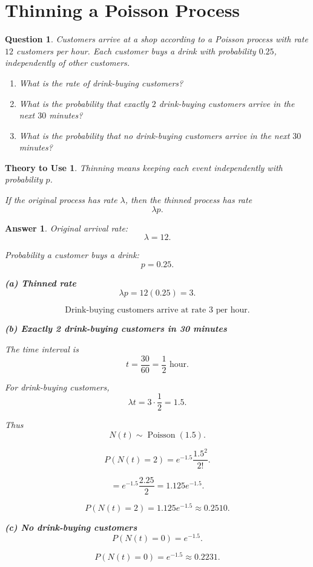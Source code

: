 \documentclass[12pt]{article}
\newtheorem{question}{Question}
\newtheorem*{theory}{Theory to Use}
\newtheorem*{answer}{Answer}
\begin{document}
\section{Thinning a Poisson Process}

\begin{question}
Customers arrive at a shop according to a Poisson process with rate \(12\) customers per hour.
Each customer buys a drink with probability \(0.25\), independently of other customers.
\begin{enumerate}[label=(\alph*)]
    \item What is the rate of drink-buying customers?
    \item What is the probability that exactly \(2\) drink-buying customers arrive in the next \(30\) minutes?
    \item What is the probability that no drink-buying customers arrive in the next \(30\) minutes?
\end{enumerate}
\end{question}

\begin{theory}
Thinning means keeping each event independently with probability \(p\).

If the original process has rate \(\lambda\), then the thinned process has rate
\[
\lambda p.
\]
\end{theory}

\begin{answer}
Original arrival rate:
\[
\lambda=12.
\]

Probability a customer buys a drink:
\[
p=0.25.
\]

\textbf{(a) Thinned rate}
\[
\lambda p=12(0.25)=3.
\]

\[
\boxed{\text{Drink-buying customers arrive at rate }3\text{ per hour}.}
\]

\textbf{(b) Exactly 2 drink-buying customers in 30 minutes}

The time interval is
\[
t=\frac{30}{60}=\frac{1}{2}\text{ hour}.
\]

For drink-buying customers,
\[
\lambda t=3\cdot \frac{1}{2}=1.5.
\]

Thus
\[
N(t)\sim \operatorname{Poisson}(1.5).
\]

\[
P(N(t)=2)=e^{-1.5}\frac{1.5^2}{2!}.
\]

\[
=e^{-1.5}\frac{2.25}{2}
=1.125e^{-1.5}.
\]

\[
\boxed{P(N(t)=2)=1.125e^{-1.5}\approx 0.2510.}
\]

\textbf{(c) No drink-buying customers}
\[
P(N(t)=0)=e^{-1.5}.
\]

\[
\boxed{P(N(t)=0)=e^{-1.5}\approx 0.2231.}
\]
\end{answer}
\end{document}
